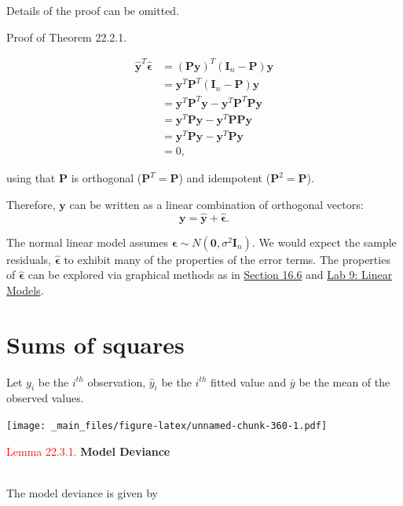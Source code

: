 \documentclass[
]{book}
\begin{document}
Details of the proof can be omitted.

Proof of Theorem 22.2.1.

\begin{align*}
\hat{\mathbf{y}}^T \hat{\mathbf{\epsilon}} &= (\mathbf{P}\mathbf{y})^T (\mathbf{I}_n - \mathbf{P}) \mathbf{y} \\
&= \mathbf{y}^T \mathbf{P}^T (\mathbf{I}_n - \mathbf{P}) \mathbf{y} \\
&= \mathbf{y}^T \mathbf{P}^T \mathbf{y} - \mathbf{y}^T \mathbf{P}^T \mathbf{P} \mathbf{y} \\
&= \mathbf{y}^T \mathbf{P} \mathbf{y} - \mathbf{y}^T \mathbf{P} \mathbf{P} \mathbf{y} \\
&= \mathbf{y}^T \mathbf{P} \mathbf{y} - \mathbf{y}^T \mathbf{P} \mathbf{y} \\
&= 0,
\end{align*}

using that \(\mathbf{P}\) is orthogonal (\(\mathbf{P}^T = \mathbf{P}\)) and idempotent (\(\mathbf{P}^2 =\mathbf{P}\)).

Therefore, \(\mathbf{y}\) can be written as a linear combination of orthogonal vectors:\\

\[\mathbf{y} = \hat{\mathbf{y}} + \hat{\mathbf{\epsilon}}.\]

The normal linear model assumes \(\mathbf{\epsilon} \sim N(\mathbf{0}, \sigma^2 \mathbf{I}_n)\). We would expect the sample residuals, \(\hat{\mathbf{\epsilon}}\) to exhibit many of the properties of the error terms. The properties of \(\hat{\mathbf{\epsilon}}\) can be explored via graphical methods as in \protect\hyperlink{Sec_LinearI:line}{Section 16.6} and \protect\hyperlink{Sec_Linear_LSE:lab}{Lab 9: Linear Models}.

\hypertarget{Sec_Linear_ANOVA:SS}{%
\section{Sums of squares}\label{Sec_Linear_ANOVA:SS}}

Let \(y_i\) be the \(i^{th}\) observation, \(\hat{y}_i\) be the \(i^{th}\) fitted value and \(\bar{y}\) be the mean of the observed values.

\texttt{[image: \_main\_files/figure-latex/unnamed-chunk-360-1.pdf]}

\hypertarget{Sec_Linear_ANOVA:lem:deviance}{}
\textcolor{red}{Lemma 22.3.1.}
{\textbf{Model Deviance}}\\
\strut \\
The model deviance is given by
\end{document}
